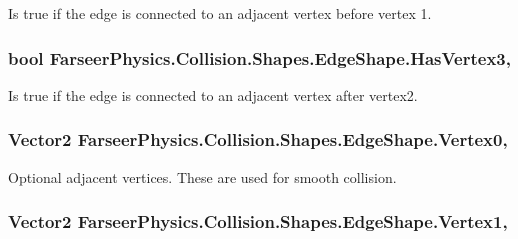 Is true if the edge is connected to an adjacent vertex before vertex 1. 

\hypertarget{class_farseer_physics_1_1_collision_1_1_shapes_1_1_edge_shape_ae7172745696408f3a1e1ddd3634b590b}{
\subsubsection[{Has\+Vertex3}]{\setlength{\rightskip}{0pt plus 5cm}bool Farseer\+Physics.\+Collision.\+Shapes.\+Edge\+Shape.\+Has\+Vertex3\hspace{0.3cm}{\ttfamily [get]}, {\ttfamily [set]}}}\label{class_farseer_physics_1_1_collision_1_1_shapes_1_1_edge_shape_ae7172745696408f3a1e1ddd3634b590b}


Is true if the edge is connected to an adjacent vertex after vertex2. 

\hypertarget{class_farseer_physics_1_1_collision_1_1_shapes_1_1_edge_shape_a44ddded5e9dd14566c2ba3c93fbf0924}{
\subsubsection[{Vertex0}]{\setlength{\rightskip}{0pt plus 5cm}Vector2 Farseer\+Physics.\+Collision.\+Shapes.\+Edge\+Shape.\+Vertex0\hspace{0.3cm}{\ttfamily [get]}, {\ttfamily [set]}}}\label{class_farseer_physics_1_1_collision_1_1_shapes_1_1_edge_shape_a44ddded5e9dd14566c2ba3c93fbf0924}


Optional adjacent vertices. These are used for smooth collision. 

\hypertarget{class_farseer_physics_1_1_collision_1_1_shapes_1_1_edge_shape_ac473feea57f067508c34ca75b99213b3}{
\subsubsection[{Vertex1}]{\setlength{\rightskip}{0pt plus 5cm}Vector2 Farseer\+Physics.\+Collision.\+Shapes.\+Edge\+Shape.\+Vertex1\hspace{0.3cm}{\ttfamily [get]}, {\ttfamily [set]}}}\label{class_farseer_physics_1_1_collision_1_1_shapes_1_1_edge_shape_ac473feea57f067508c34ca75b99213b3}


